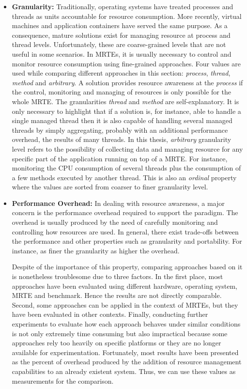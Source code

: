 \begin{itemize}
\item \textbf{Granularity:}
Traditionally, operating systems have treated processes and threads as units accountable for resource consumption.
More recently, virtual machines and application containers have served the same purpose.
As a consequence, mature solutions exist for managing resource at process and thread levels.
Unfortunately, these are coarse-grained levels that are not useful in some scenarios.
In MRTEs, it is usually necessary to control and monitor resource consumption using fine-grained approaches.
Four values are used while comparing different approaches in this section: \textit{process}, \textit{thread}, \textit{method} and \textit{arbitrary}.
A solution provides resource awareness at the \textit{process} if the control, monitoring and managing of resources is only possible for the whole MRTE.
The granularities \textit{thread} and \textit{method} are self-explanatory.
It is only necessary to highlight that if a solution is, for instance, able to handle a single managed thread then it is also capable of handling several managed threads by simply aggregating, probably with an additional performance overhead, the results of many threads.
In this thesis, \textit{arbitrary} granularity level refers to the possibility of collecting data and managing resource for any specific part of the application running on top of a MRTE.
For instance, monitoring the CPU consumption of several threads plus the consumption of a few methods executed by another thread.
This is also an \textit{ordinal} property where the values are sorted from coarser to finer granularity level.

\item \textbf{Performance Overhead:} 
In dealing with resource awareness, a major concern is the performance overhead required to support the paradigm.
The overhead is usually produced by the need of carefully monitoring and controlling how resources are used.
In general, there exist trade-offs between the performance and other properties such as granularity and portability.
For instance, as finer the granularity as higher the overhead.

Despite of the importance of this property, comparing approaches based on it is nonetheless troublesome due to three factors.
In the first place, most approaches have been evaluated using different hardware, operating system, MRTE and benchmark.
Hence the results are not directly comparable.  
Second, some approaches can be applied in the context of MRTEs, but they have been evaluated in other contexts.
Finally, conducting further experiments to evaluate how each approach behaves under similar conditions is not only extremely time consuming but also impractical because some approaches rely too heavily on specific platforms or they are no longer available for experimentation.
Fortunately, most results have been presented as the percent of overhead produced by the addition of resource management capabilities to an already existent system.
Thus, we can use these values as measurements for the comparison.


\end{itemize}
